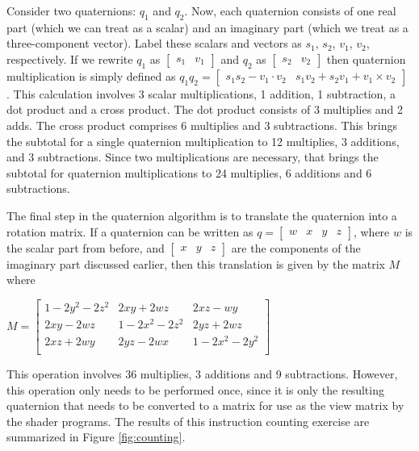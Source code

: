 \documentclass{acm_proc_article-sp}
\begin{document}
Consider two quaternions: $q_1$ and $q_2$.
Now, each quaternion consists of one real part (which we can treat as a scalar) and an imaginary part (which we treat as a three-component vector).
Label these scalars and vectors as $s_1$, $s_2$, $v_1$, $v_2$, respectively.
If we rewrite $q_1$ as $\left[ \begin{array}{cc} s_1 & v_1 \end{array} \right]$ and $q_2$ as $\left[ \begin{array}{cc} s_2 & v_2 \end{array} \right]$ then quaternion multiplication is simply defined as $q_1 q_2 = \left[ \begin{array}{cc} s_1 s_2 - v_1 \cdot v_2 & s_1 v_2 + s_2 v_1 + v_1 \times v_2 \end{array} \right]$ \cite{schoemake85}.
This calculation involves 3 scalar multiplications, 1 addition, 1 subtraction, a dot product and a cross product.
The dot product consists of 3 multiplies and 2 adds.
The cross product comprises 6 multiplies and 3 subtractions.
This brings the subtotal for a single quaternion multiplication to 12 multiplies, 3 additions, and 3 subtractions.
Since two multiplications are necessary, that brings the subtotal for quaternion multiplications to 24 multiplies, 6 additions and 6 subtractions.

The final step in the quaternion algorithm is to translate the quaternion into a rotation matrix.
If a quaternion can be written as $q = \left[ \begin{array}{cccc} w & x & y & z \end{array} \right]$, where $w$ is the scalar part from before, and $\left[ \begin{array}{ccc} x & y & z \end{array} \right]$ are the components of the imaginary part discussed earlier, then this translation is given by the matrix $M$ where

$M = \left[ \begin{array}{ccc}
    1 - 2y^2 - 2z^2 & 2xy + 2wz & 2xz - wy \\
    2xy - 2wz & 1 - 2x^2 - 2z^2 & 2yz + 2wz \\
    2xz + 2wy & 2yz - 2wx & 1 - 2x^2 - 2y^2 \\
    \end{array}\right]$

This operation involves 36 multiplies, 3 additions and 9 subtractions.
However, this operation only needs to be performed once, since it is only the resulting quaternion that needs to be converted to a matrix for use as the view matrix by the shader programs.
The results of this instruction counting exercise are summarized in Figure \ref{fig:counting}.
\end{document}

